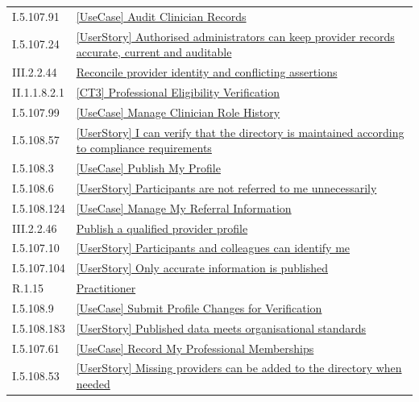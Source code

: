\begin{longtable}{p{.22\linewidth}p{.73\linewidth}}
I.5.107.91 & \hyperref[element:38728966a1a144aeacdf62cef66a0c75]{[UseCase] Audit Clinician Records} \\
I.5.107.24 & \hyperref[element:387c93b9fe3a48388293922d09b1d3b1]{[UserStory] Authorised administrators can keep provider records accurate, current and auditable} \\
III.2.2.44 & \hyperref[element:3afbc885a4a74b24a1240acb8725bad2]{Reconcile provider identity and conflicting assertions} \\
II.1.1.8.2.1 & \hyperref[element:3b43d350a52a4b608bc01eb2530a91be]{[CT3] Professional Eligibility Verification} \\
I.5.107.99 & \hyperref[element:3dbbb21b0e17424ca5c794d445318efe]{[UseCase] Manage Clinician Role History} \\
I.5.108.57 & \hyperref[element:3ecbfdc1c19b43f3be7a0137571a15a0]{[UserStory] I can verify that the directory is maintained according to compliance requirements} \\
I.5.108.3 & \hyperref[element:3fd478e4f8164922960fb318f7bee05e]{[UseCase] Publish My Profile} \\
I.5.108.6 & \hyperref[element:4433e39f0aa244bdb943c12dacff7c58]{[UserStory] Participants are not referred to me unnecessarily} \\
I.5.108.124 & \hyperref[element:44e41581c61e42b6b217527c6e88f171]{[UseCase] Manage My Referral Information} \\
III.2.2.46 & \hyperref[element:4522e0c4204e4c0c93d2b1f9ef3887ad]{Publish a qualified provider profile} \\
I.5.107.10 & \hyperref[element:48a056c7f73549e4b742a1e45c93f2a9]{[UserStory] Participants and colleagues can identify me} \\
I.5.107.104 & \hyperref[element:48b60086332d473fbb637f4e411d6f48]{[UserStory] Only accurate information is published} \\
R.1.15 & \hyperref[element:49480591b4554983aaa82a79c1568bf3]{Practitioner} \\
I.5.108.9 & \hyperref[element:4bdda65cba2d4c74b0c69dea843938a0]{[UseCase] Submit Profile Changes for Verification} \\
I.5.108.183 & \hyperref[element:4cf7c7a86c8f4287aea87bc9e5b7c8be]{[UserStory] Published data meets organisational standards} \\
I.5.107.61 & \hyperref[element:4d50a645b95a4b5b8c06008c5b67ed1a]{[UseCase] Record My Professional Memberships} \\
I.5.108.53 & \hyperref[element:4dc5ef9d97d14b92b8edb01af4bd5855]{[UserStory] Missing providers can be added to the directory when needed} \\

\end{longtable}
